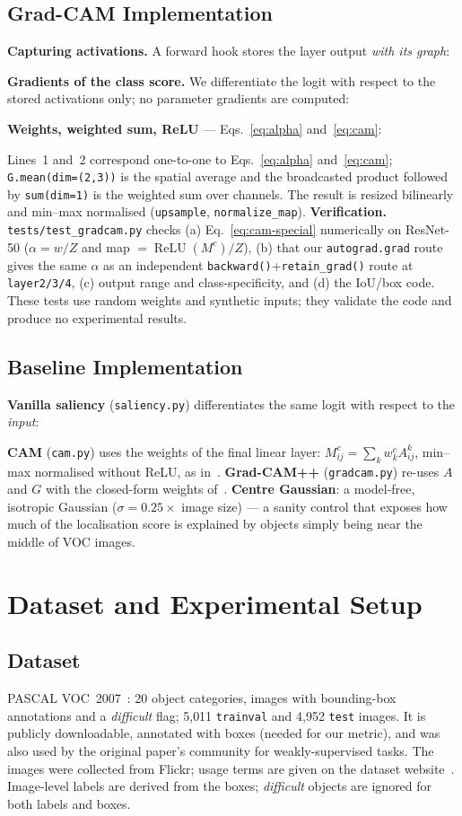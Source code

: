 \documentclass[11pt,a4paper]{article}
\newcommand{\GC}{Grad-CAM}
\DeclareMathOperator{\ReLU}{ReLU}
\begin{document}
\subsection{\GC{} Implementation}
\textbf{Capturing activations.} A forward hook stores the layer output \emph{with its graph}:

\textbf{Gradients of the class score.} We differentiate the logit with respect to the stored activations only; no parameter gradients are computed:

\textbf{Weights, weighted sum, ReLU} --- Eqs.~\eqref{eq:alpha} and~\eqref{eq:cam}:

Lines~1 and~2 correspond one-to-one to Eqs.~\eqref{eq:alpha} and~\eqref{eq:cam}; \texttt{G.mean(dim=(2,3))} is the spatial average and the broadcasted product followed by \texttt{sum(dim=1)} is the weighted sum over channels. The result is resized bilinearly and min--max normalised (\texttt{upsample}, \texttt{normalize\_map}). \textbf{Verification.} \texttt{tests/test\_gradcam.py} checks (a) Eq.~\eqref{eq:cam-special} numerically on ResNet-50 ($\alpha=w/Z$ and map $=\ReLU(M^c)/Z$), (b) that our \texttt{autograd.grad} route gives the same $\alpha$ as an independent \texttt{backward()}+\texttt{retain\_grad()} route at \texttt{layer2/3/4}, (c) output range and class-specificity, and (d) the IoU/box code. These tests use random weights and synthetic inputs; they validate the code and produce no experimental results.
\subsection{Baseline Implementation}
\textbf{Vanilla saliency} (\texttt{saliency.py}) differentiates the same logit with respect to the \emph{input}:

\textbf{CAM} (\texttt{cam.py}) uses the weights of the final linear layer: $M^c_{ij}=\sum_kw^c_kA^k_{ij}$, min--max normalised without ReLU, as in~\citep{zhou2016}. \textbf{Grad-CAM++} (\texttt{gradcam.py}) re-uses $A$ and $G$ with the closed-form weights of~\citep{chattopadhay2018}. \textbf{Centre Gaussian}: a model-free, isotropic Gaussian ($\sigma=0.25\times$ image size) --- a sanity control that exposes how much of the localisation score is explained by objects simply being near the middle of VOC images.

\section{Dataset and Experimental Setup}\label{sec:setup}
\subsection{Dataset}
PASCAL VOC~2007~\citep{everingham2010,voc2007}: 20 object categories, images with bounding-box annotations and a \emph{difficult} flag; 5{,}011 \texttt{trainval} and 4{,}952 \texttt{test} images. It is publicly downloadable, annotated with boxes (needed for our metric), and was also used by the original paper's community for weakly-supervised tasks. The images were collected from Flickr; usage terms are given on the dataset website~\citep{voc2007}. Image-level labels are derived from the boxes; \emph{difficult} objects are ignored for both labels and boxes.
\end{document}
